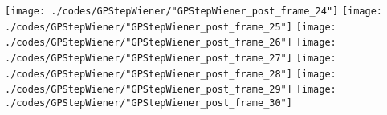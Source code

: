 \begin{frame}{\insertsection}
\begin{center}
{\begin{animateinline}{15}
				 \texttt{[image: ./codes/GPStepWiener/"GPStepWiener\_post\_frame\_24"]}\newframe
				 \texttt{[image: ./codes/GPStepWiener/"GPStepWiener\_post\_frame\_25"]}\newframe
				 \texttt{[image: ./codes/GPStepWiener/"GPStepWiener\_post\_frame\_26"]}\newframe
				 \texttt{[image: ./codes/GPStepWiener/"GPStepWiener\_post\_frame\_27"]}\newframe
				 \texttt{[image: ./codes/GPStepWiener/"GPStepWiener\_post\_frame\_28"]}\newframe
				 \texttt{[image: ./codes/GPStepWiener/"GPStepWiener\_post\_frame\_29"]}\newframe
				 \texttt{[image: ./codes/GPStepWiener/"GPStepWiener\_post\_frame\_30"]}
			 \end{animateinline}
			}
	\end{center}
    
\end{frame}



